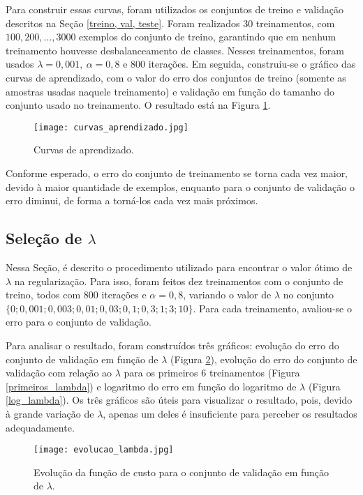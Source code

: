 \documentclass[12pt]{article}
\begin{document}
Para construir essas curvas, foram utilizados os conjuntos de treino e validação descritos na Seção \ref{treino, val, teste}. Foram realizados 30 treinamentos, com $100, 200, \ldots, 3000$ exemplos do conjunto de treino, garantindo que em nenhum treinamento houvesse desbalanceamento de classes. Nesses treinamentos, foram usados $\lambda=0,001, \ \alpha=0,8$ e 800 iterações. Em seguida, construiu-se o gráfico das curvas de aprendizado, com o valor do erro dos conjuntos de treino (somente as amostras usadas naquele treinamento) e validação em função do tamanho do conjunto usado no treinamento. O resultado está na Figura \ref{curvas_aprendizado}.

\begin{figure}
\begin{center}
\texttt{[image: curvas\_aprendizado.jpg]}
\caption{Curvas de aprendizado.} \label{curvas_aprendizado}\end{center}
\end{figure}

Conforme esperado, o erro do conjunto de treinamento se torna cada vez maior, devido à maior quantidade de exemplos, enquanto para o conjunto de validação o erro diminui, de forma a torná-los cada vez mais próximos. 

\subsection{Seleção de $\lambda$} \label{lambda_otimo}
Nessa Seção, é descrito o procedimento utilizado para encontrar o valor ótimo de $\lambda$ na regularização. Para isso, foram feitos dez treinamentos com o conjunto de treino, todos com 800 iterações e $\alpha=0,8$, variando o valor de $\lambda$ no conjunto $\{0; 0,001; 0,003; 0,01; 0,03; 0,1; 0,3; 1; 3; 10\}$. Para cada treinamento, avaliou-se o erro para o conjunto de validação.

Para analisar o resultado, foram construídos três gráficos:  evolução do erro do conjunto de validação em função de $\lambda$ (Figura \ref{evolucao_lambda}),  evolução do erro do conjunto de validação com relação ao $\lambda$ para os primeiros 6 treinamentos (Figura \ref{primeiros_lambda}) e logaritmo do erro em função do logaritmo de $\lambda$ (Figura \ref{log_lambda}). Os três gráficos são úteis para visualizar o resultado, pois, devido à grande variação de $\lambda$, apenas um deles é insuficiente para perceber os resultados adequadamente.

\begin{figure}
\begin{center}
\texttt{[image: evolucao\_lambda.jpg]}
\caption{Evolução da função de custo para o conjunto de validação em função de $\lambda$.} \label{evolucao_lambda}
\end{center}
\end{figure}
\end{document}

